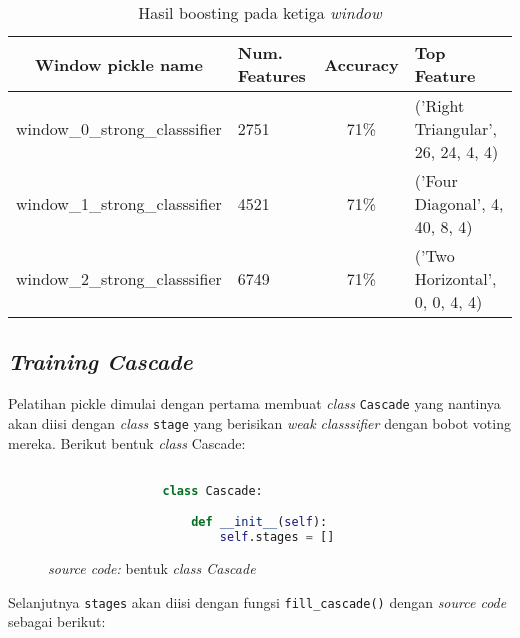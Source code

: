 		\begin{table}[h]
			\caption{Hasil boosting pada ketiga \textit{window}}
			\label{tab:mytable}
			\centering
			\begin{tabular}{|c|p{2cm}|c|p{3cm}|}
				\hline
				\textbf{Window pickle name} & \textbf{Num. Features} & \textbf{Accuracy} & \textbf{Top Feature} \\
				\hline
				window\_0\_strong\_classsifier & 2751 & 71\% & ('Right Triangular', 26, 24, 4, 4) \\
				\hline
				window\_1\_strong\_classsifier & 4521 & 71\% & ('Four Diagonal', 4, 40, 8, 4) \\
				\hline
				window\_2\_strong\_classsifier & 6749 & 71\% &  ('Two Horizontal', 0, 0, 4, 4) \\
				\hline

			\end{tabular}
		\end{table}
		
	\subsection{\textit{Training Cascade}}
		
		Pelatihan pickle dimulai dengan pertama membuat \textit{class} \texttt{Cascade} yang 
		nantinya akan diisi dengan \textit{class} \texttt{stage} yang berisikan \emph{weak classsifier} 
		dengan bobot voting mereka. Berikut bentuk \textit{class} Cascade:

		\begin{figure}[H]
			\begin{lstlisting}[language=Python, basicstyle=\tiny]

				class Cascade:

					def __init__(self):
						self.stages = []

			\end{lstlisting}
			\caption{\emph{source code:} bentuk \textit{class Cascade}}
			\label{code: Cascade class}
		\end{figure}

		Selanjutnya \texttt{stages} akan diisi dengan fungsi \texttt{fill\_cascade()} dengan 
		\textit{source code} sebagai berikut:

